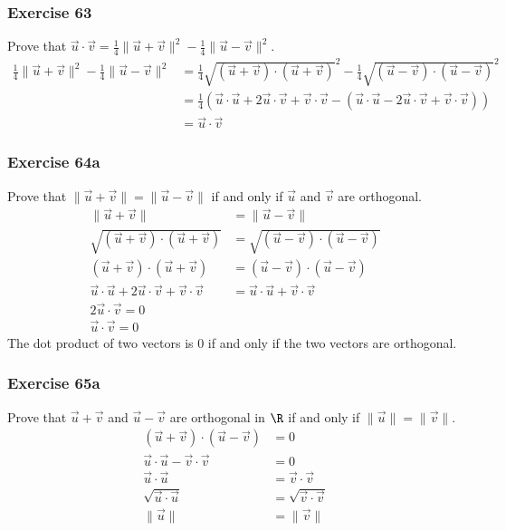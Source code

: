 \documentclass{math}
\begin{document}
\subsubsection*{Exercise 63}
Prove that \( \vec{u}\cdot\vec{v} = \frac{1}{4}\|\vec{u}+\vec{v}\|^2-
\frac{1}{4}\|\vec{u}-\vec{v}\|^2 \).
\begin{align*}
  \frac{1}{4}\|\vec{u}+\vec{v}\|^2-\frac{1}{4}\|\vec{u}-\vec{v}\|^2 &=
    \frac{1}{4}\sqrt{(\vec{u}+\vec{v})\cdot(\vec{u}+\vec{v})}^2-
    \frac{1}{4}\sqrt{(\vec{u}-\vec{v})\cdot(\vec{u}-\vec{v})}^2 \\
  &= \frac{1}{4}(\vec{u}\cdot\vec{u}+2\vec{u}\cdot\vec{v}+\vec{v}\cdot\vec{v}-
    (\vec{u}\cdot\vec{u}-2\vec{u}\cdot\vec{v}+\vec{v}\cdot\vec{v})) \\
  &= \vec{u}\cdot\vec{v}
\end{align*}

\subsubsection*{Exercise 64a}
Prove that \( \|\vec{u}+\vec{v}\| = \|\vec{u}-\vec{v}\| \) if and only if
\( \vec{u} \) and \( \vec{v} \) are orthogonal.
\begin{align*}
  \|\vec{u}+\vec{v}\| &= \|\vec{u}-\vec{v}\| \\
  \sqrt{(\vec{u}+\vec{v})\cdot(\vec{u}+\vec{v})} &=
    \sqrt{(\vec{u}-\vec{v})\cdot(\vec{u}-\vec{v})} \\
  (\vec{u}+\vec{v})\cdot(\vec{u}+\vec{v}) &=
    (\vec{u}-\vec{v})\cdot(\vec{u}-\vec{v}) \\
  \vec{u}\cdot\vec{u}+2\vec{u}\cdot\vec{v}+\vec{v}\cdot\vec{v} &=
    \vec{u}\cdot\vec{u}+\vec{v}\cdot\vec{v} \\
  2\vec{u}\cdot\vec{v} = 0 \\
  \vec{u}\cdot\vec{v} = 0
\end{align*}
The dot product of two vectors is 0 if and only if the two vectors are
orthogonal.

\subsubsection*{Exercise 65a}
Prove that \( \vec{u}+\vec{v} \) and \( \vec{u}-\vec{v} \) are orthogonal in
\( \R \) if and only if \( \|\vec{u}\| = \|\vec{v}\| \).
\begin{align*}
  (\vec{u}+\vec{v})\cdot(\vec{u}-\vec{v}) &= 0 \\
  \vec{u}\cdot\vec{u}-\vec{v}\cdot\vec{v} &= 0 \\
  \vec{u}\cdot\vec{u} &= \vec{v}\cdot\vec{v} \\
  \sqrt{\vec{u}\cdot\vec{u}} &= \sqrt{\vec{v}\cdot\vec{v}} \\
  \|\vec{u}\| &= \|\vec{v}\|
\end{align*}
\end{document}
